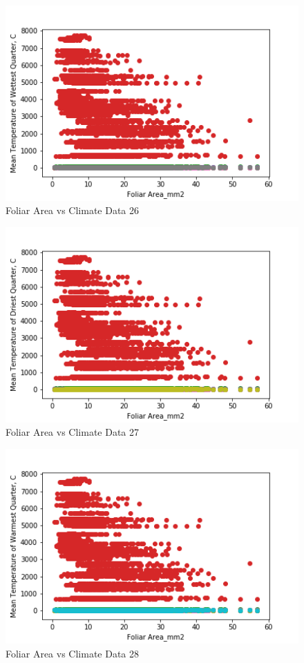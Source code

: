 \documentclass[letterpaper]{article}
\begin{document}
\begin{figure}[h]
\caption{Foliar Area vs Climate Data 26\label{fig:Foliar_Area_vs_26}}
\centering
\includegraphics[width=0.7\paperwidth]{Foliar_Area_vs_26}
\end{figure}


\begin{figure}[h]
\caption{Foliar Area vs Climate Data 27\label{fig:Foliar_Area_vs_27}}
\centering
\includegraphics[width=0.7\paperwidth]{Foliar_Area_vs_27}
\end{figure}


\begin{figure}[h]
\caption{Foliar Area vs Climate Data 28\label{fig:Foliar_Area_vs_28}}
\centering
\includegraphics[width=0.7\paperwidth]{Foliar_Area_vs_28}
\end{figure}
\end{document}
